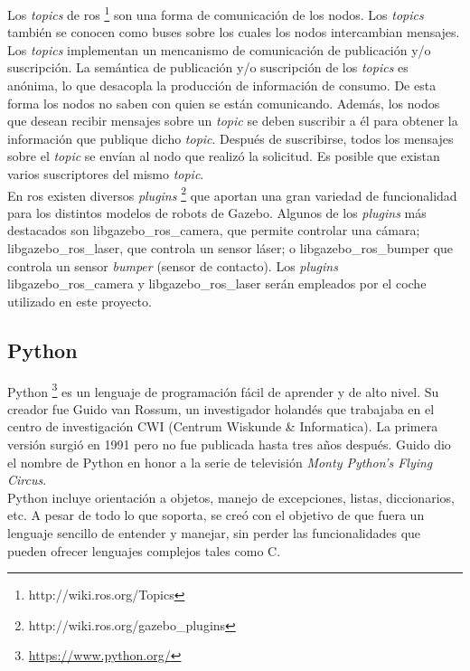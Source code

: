 Los \textit{topics} de \acrshort{ros} \footnote{http://wiki.ros.org/Topics} \cite{ros_book} son una forma de comunicación de los nodos. Los \textit{topics} también se conocen como buses sobre los cuales los nodos intercambian mensajes. Los \textit{topics} implementan un mencanismo de comunicación de publicación y/o suscripción. La semántica de publicación y/o suscripción de los \textit{topics} es anónima, lo que desacopla la producción de información de consumo. De esta forma los nodos no saben con quien se están comunicando. Además, los nodos que desean recibir mensajes sobre un \textit{topic} se deben suscribir a él para obtener la información que publique dicho \textit{topic}. Después de suscribirse, todos los mensajes sobre el \textit{topic} se envían al nodo que realizó la solicitud. Es posible que existan varios suscriptores del mismo \textit{topic}.\\

En \acrshort{ros} existen diversos \textit{plugins} \footnote{http://wiki.ros.org/gazebo\_plugins} que aportan una gran variedad de funcionalidad para los distintos modelos de robots de Gazebo. Algunos de los \textit{plugins} más destacados son libgazebo\_ros\_camera, que permite controlar una cámara; libgazebo\_ros\_laser, que controla un sensor láser; o libgazebo\_ros\_bumper que controla un sensor \textit{bumper} (sensor de contacto). Los \textit{plugins} libgazebo\_ros\_camera y  libgazebo\_ros\_laser serán empleados por el coche utilizado en este proyecto.



\subsection{Python}

Python \footnote{\url{https://www.python.org/}} es un lenguaje de programación fácil de aprender y de alto nivel. Su creador fue Guido van Rossum, un investigador holandés que trabajaba en el centro de investigación CWI (Centrum Wiskunde \& Informatica). La primera versión surgió en 1991 pero no fue publicada hasta tres años después. Guido dio el nombre de Python en honor a la serie de televisión \textit{Monty Python’s Flying Circus}.\\

Python incluye orientación a objetos, manejo de excepciones, listas, diccionarios, etc. A pesar de todo lo que soporta, se creó con el objetivo de que fuera un lenguaje sencillo de entender y manejar, sin perder las funcionalidades que pueden ofrecer lenguajes complejos tales como C.\\

